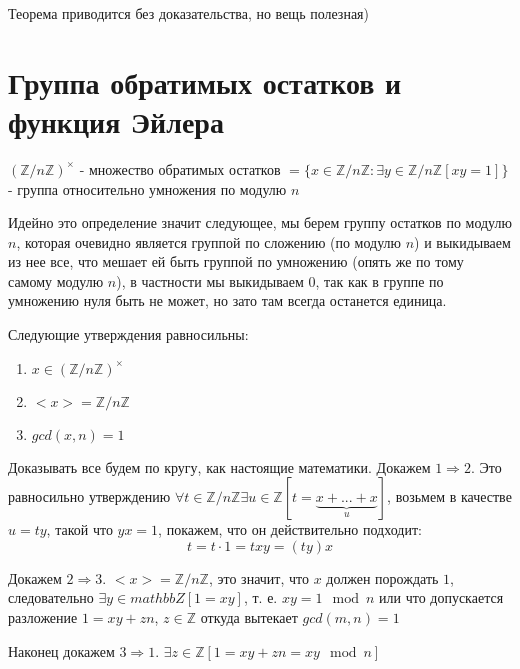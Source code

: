 Теорема приводится без доказательства, но вещь полезная)

\section{Группа обратимых остатков и функция Эйлера}

\begin{Def}
$\left(\mathbb{Z} / {n \mathbb{Z}}\right)^{\times}$ - множество обратимых остатков $ = \{x \in \mathbb{Z} / {n \mathbb{Z}} : \exists y \in \mathbb{Z}/{n \mathbb{Z}} \left[xy = 1\right]\}$ - группа относительно умножения по модулю $n$
\end{Def}

Идейно это определение значит следующее, мы берем группу остатков по модулю $n$, которая очевидно является группой по сложению (по модулю $n$) и выкидываем из нее все, что мешает ей быть группой по умножению (опять же по тому самому модулю $n$), в частности мы выкидываем 0, так как в группе по умножению нуля быть не может, но зато там всегда останется единица.

\begin{Th}
Следующие утверждения равносильны:
\begin{enumerate}
\item $x \in \left(\mathbb{Z} / {n \mathbb{Z}}\right)^{\times}$

\item $<x> = \mathbb{Z} / {n \mathbb{Z}}$

\item $gcd\left(x,n\right) = 1$
\end{enumerate}
\end{Th}

\begin{Proof}
Доказывать все будем по кругу, как настоящие математики. Докажем $1 \Rightarrow 2$. Это равносильно утверждению $\forall t \in \mathbb{Z} / {n \mathbb{Z}} \exists u \in \mathbb{Z} \left[t = \underbrace{x + ... + x}_{u}\right]$, возьмем в качестве $u = ty$, такой что $yx = 1$, покажем, что он действительно подходит:
\[
	t = t \cdot 1 = t x y = \left(t y\right) x
\]

Докажем $2 \Rightarrow  3$. $<x> = \mathbb{Z} / {n \mathbb{Z}}$, это значит, что $x$ должен порождать $1$, следовательно $\exists y \in mathbb{Z} \left[1 = xy\right]$, т. е. $xy = 1 \mod n$ или что допускается разложение $1 = x y + z n$, $z \in \mathbb{Z}$ откуда вытекает $gcd\left(m,n\right) = 1$

Наконец докажем $3 \Rightarrow 1$. $\exists z \in \mathbb{Z} \left[1 = xy + zn = xy \mod n\right]$
\end{Proof}

